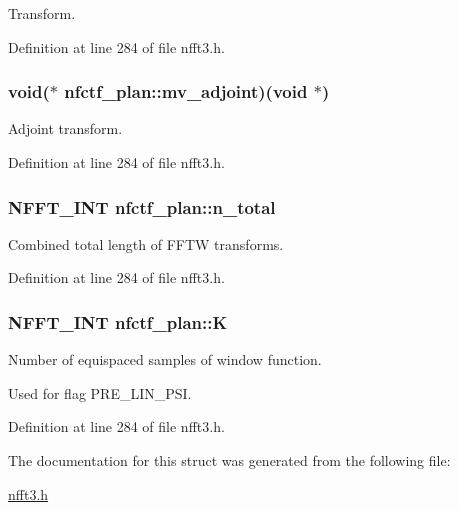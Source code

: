 Transform. 



Definition at line 284 of file nfft3.\-h.

\hypertarget{structnfctf__plan_a876dda7208fd0634f426c1e5cb04b77f}{
\subsubsection[{mv\-\_\-adjoint}]{\setlength{\rightskip}{0pt plus 5cm}void($\ast$ nfctf\-\_\-plan\-::mv\-\_\-adjoint)(void $\ast$)}}\label{structnfctf__plan_a876dda7208fd0634f426c1e5cb04b77f}


Adjoint transform. 



Definition at line 284 of file nfft3.\-h.

\hypertarget{structnfctf__plan_a418f1f493fd912497850d5c16c19b851}{
\subsubsection[{n\-\_\-total}]{\setlength{\rightskip}{0pt plus 5cm}N\-F\-F\-T\-\_\-\-I\-N\-T nfctf\-\_\-plan\-::n\-\_\-total}}\label{structnfctf__plan_a418f1f493fd912497850d5c16c19b851}


Combined total length of F\-F\-T\-W transforms. 



Definition at line 284 of file nfft3.\-h.

\hypertarget{structnfctf__plan_a0df82c55678182181b649079cf507eb1}{
\subsubsection[{K}]{\setlength{\rightskip}{0pt plus 5cm}N\-F\-F\-T\-\_\-\-I\-N\-T nfctf\-\_\-plan\-::\-K}}\label{structnfctf__plan_a0df82c55678182181b649079cf507eb1}


Number of equispaced samples of window function. 

Used for flag P\-R\-E\-\_\-\-L\-I\-N\-\_\-\-P\-S\-I. 

Definition at line 284 of file nfft3.\-h.



The documentation for this struct was generated from the following file\-:\begin{DoxyCompactItemize}
\item 
\hyperlink{nfft3_8h}{nfft3.\-h}\end{DoxyCompactItemize}

